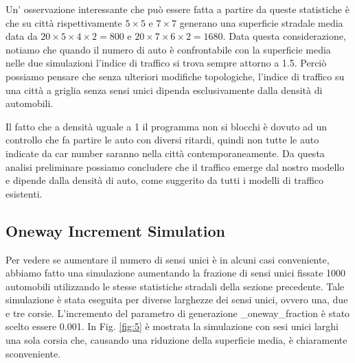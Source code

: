 \documentclass[main.tex]{subfiles}
\begin{document}
        Un' osservazione interessante che può essere fatta a partire da queste statistiche è che su città rispettivamente
        $5 \times 5$ e $7 \times 7$ generano una superficie stradale media data da $20 \times 5 \times 4 \times 2 = 800$ e
        $20 \times 7 \times 6 \times 2 = 1680$. Data questa considerazione, notiamo che quando il numero di auto è confrontabile con 
        la superficie media nelle due simulazioni l'indice di traffico si trova sempre attorno a 1.5.
        Perciò possiamo pensare che senza ulteriori modifiche topologiche, l'indice di traffico su una città a griglia
        senza sensi unici dipenda esclusivamente dalla densità di automobili.

        Il fatto che a densità uguale a 1 il programma non si blocchi è dovuto ad un controllo che fa partire le auto con diversi ritardi,
        quindi non tutte le auto indicate da car number saranno nella città contemporaneamente.
        Da questa analisi preliminare possiamo concludere che il traffico emerge dal nostro modello e dipende dalla densità di auto,
        come suggerito da tutti i modelli di traffico esistenti.

    \subsection{Oneway Increment Simulation}
        Per vedere se aumentare il numero di sensi unici è in alcuni casi conveniente, abbiamo fatto una simulazione aumentando la frazione di sensi unici 
        fissate 1000 automobili utilizzando le stesse statistiche stradali della sezione precedente. Tale simulazione è stata eseguita per diverse larghezze dei sensi unici, ovvero una, due e tre corsie.
        L'incremento del parametro di generazione \_oneway\_fraction è stato scelto essere 0.001.
        In Fig. \ref{fig:5} è mostrata la simulazione con sesi unici larghi una sola corsia che, causando una riduzione della superficie media, è chiaramente sconveniente.
\end{document}
